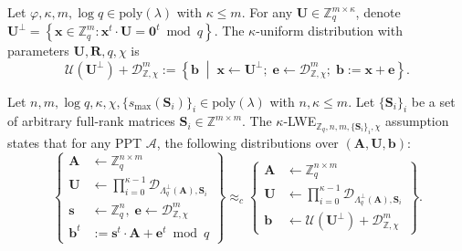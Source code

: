 \begin{definition}
Let $\varphi,\kappa,m,\log q \in \mathrm{poly}(\lambda)$ with $\kappa \le m$.
For any $\mathbf{U} \in \mathbb{Z}_q^{m\times \kappa}$, denote
$\mathbf{U}^{\perp} = \left\{\mathbf{x} \in \mathbb{Z}_q^m : \mathbf{x}^t \cdot \mathbf{U} = \mathbf{0}^t \bmod q \right\}.$
The $\kappa$-uniform distribution with parameters $\mathbf{U},\mathbf{R},q,\chi$ is
\[
\mathcal{U}(\mathbf{U}^{\perp}) + \mathcal{D}_{\mathbb{Z},\chi}^{m}
:=
\left\{
\mathbf{b}
\;\middle|\;
\mathbf{x}\leftarrow \mathbf{U}^{\perp};
\;
\mathbf{e}\leftarrow \mathcal{D}_{\mathbb{Z},\chi}^{m};
\;
\mathbf{b}:=\mathbf{x}+\mathbf{e}
\right\}.
\]
\end{definition}

\begin{definition}
Let $n,m,\log q,\kappa,\chi,\{s_{\max}(\mathbf{S}_i)\}_i \in \mathrm{poly}(\lambda)$ with $n,\kappa \le m$.
Let $\{\mathbf{S}_i\}_i$ be a set of arbitrary full-rank matrices
$\mathbf{S}_i \in \mathbb{Z}^{ m \times  m}$.
The $\kappa$-LWE$_{\mathbb{Z}_q,n,m,\{\mathbf{S}_i\}_i,\chi}$ assumption states that for any PPT $\mathcal{A}$,
the following distributions over $(\mathbf{A},\mathbf{U},\mathbf{b})$:
\[
\left\{
\begin{aligned}
\mathbf{A} &\leftarrow \mathbb{Z}_q^{n\times m} \\
\mathbf{U} &\leftarrow \prod_{i=0}^{\kappa-1} \mathcal{D}_{\Lambda_q^{\perp}(\mathbf{A}),\mathbf{S}_i} \\
\mathbf{s} &\leftarrow \mathbb{Z}_q^{n},\;\mathbf{e}\leftarrow \mathcal{D}_{\mathbb{Z},\chi}^{m} \\
\mathbf{b}^{t} &:= \mathbf{s}^{t}\cdot \mathbf{A} + \mathbf{e}^{t} \bmod q
\end{aligned}
\right\}
\approx_c
\left\{
\begin{aligned}
\mathbf{A} &\leftarrow \mathbb{Z}_q^{n\times m} \\
\mathbf{U} &\leftarrow \prod_{i=0}^{\kappa-1} \mathcal{D}_{\Lambda_q^{\perp}(\mathbf{A}),\mathbf{S}_i} \\
\mathbf{b} &\leftarrow \mathcal{U}(\mathbf{U}^{\perp}) + \mathcal{D}_{\mathbb{Z},\chi}^{m}
\end{aligned}
\right\}.
\]
\end{definition}

